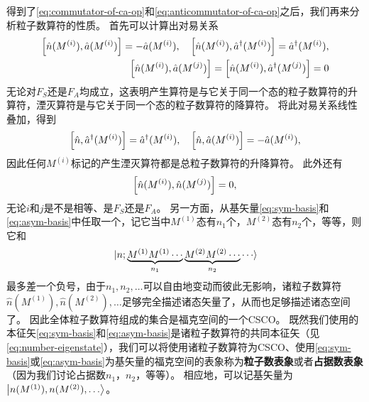 \documentclass[UTF8, a4paper]{ctexart}
\begin{document}
得到了\eqref{eq:commutator-of-ca-op}和\eqref{eq:anticommutator-of-ca-op}之后，我们再来分析粒子数算符的性质。
首先可以计算出对易关系
\begin{equation}
    \begin{aligned}
        \comm{\hat{n}(M^{(i)})}{\hat{a}(M^{(i)})} = - \hat{a}(M^{(i)}), \quad \comm{\hat{n}(M^{(i)})}{\hat{a}^\dagger(M^{(i)})} = \hat{a}^\dagger(M^{(i)}), \\
        \comm{\hat{n}(M^{(i)})}{\hat{a}(M^{(j)})} = \comm{\hat{n}(M^{(i)})}{\hat{a}^\dagger (M^{(j)})} = 0
        \label{eq:commutator-n-a}
    \end{aligned}
\end{equation}
无论对$F_S$还是$F_A$均成立，这表明产生算符是与它关于同一个态的粒子数算符的升算符，湮灭算符是与它关于同一个态的粒子数算符的降算符。
将此对易关系线性叠加，得到
\begin{equation}
    \comm{\hat{n}}{\hat{a}^\dagger (M^{(i)})} =  \hat{a}^\dagger (M^{(i)}), \quad \comm{\hat{n}}{\hat{a} (M^{(i)})} =  -\hat{a} (M^{(i)}),
    \label{eq:commutator-ntotal-a}
\end{equation}
因此任何$M^{(i)}$标记的产生湮灭算符都是总粒子数算符的升降算符。
此外还有
\begin{equation}
    \comm{\hat{n}(M^{(i)})}{\hat{n}(M^{(j)})} = 0,
    \label{eq:commutator-n-and-n}
\end{equation}
无论$i$和$j$是不是相等、是$F_S$还是$F_A$。
另一方面，从基矢量\eqref{eq:sym-basis}和\eqref{eq:asym-basis}中任取一个，记它当中$M^{(1)}$态有$n_1$个，$M^{(2)}$态有$n_2$个，等等，则它和
\[
    \ket*{n; \underbrace{M^{(1)} M^{(1)} \cdots}_{n_1} \underbrace{M^{(2)} M^{(2)} \cdots}_{n_2} \cdots} 
\]
最多差一个负号，由于$n_1, n_2, \ldots$可以自由地变动而彼此无影响，诸粒子数算符$\hat{n}(M^{(1)}), \hat{n}(M^{(2)}), \ldots$足够完全描述诸态矢量了，从而也足够描述诸态空间了。
因此全体粒子数算符组成的集合是福克空间的一个CSCO。
既然我们使用的本征矢\eqref{eq:sym-basis}和\eqref{eq:asym-basis}是诸粒子数算符的共同本征矢（见\eqref{eq:number-eigenstate}），我们可以将使用诸粒子数算符为CSCO、使用\eqref{eq:sym-basis}或\eqref{eq:asym-basis}为基矢量的福克空间的表象称为\textbf{粒子数表象}或者\textbf{占据数表象}（因为我们讨论占据数$n_1$，$n_2$，等等）。
相应地，可以记基矢量为$\ket{n(M^{(1)}), n(M^{(2)}), \ldots}$。
\end{document}
